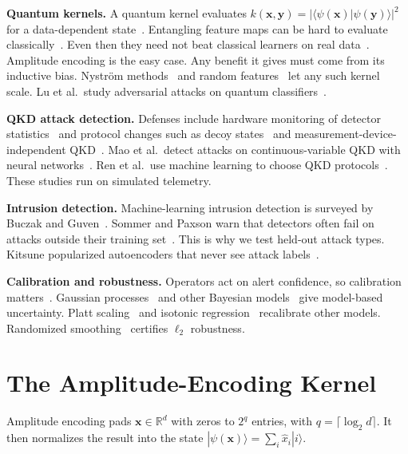\documentclass[journal]{IEEEtran}
\begin{document}
\textbf{Quantum kernels.} A quantum kernel evaluates
$k(\mathbf{x},\mathbf{y})=|\langle\psi(\mathbf{x})|\psi(\mathbf{y})\rangle|^2$ for a
data-dependent state~\cite{havlicek2019supervised}. Entangling feature maps can be
hard to evaluate classically~\cite{liu2021rigorous}. Even then they need not beat
classical learners on real data~\cite{huang2021power}. Amplitude encoding is the
easy case. Any benefit it gives must come from its inductive bias. Nystr\"om
methods~\cite{williams2001nystrom} and random features~\cite{rahimi2007random} let
any such kernel scale. Lu et al.\ study adversarial attacks on quantum
classifiers~\cite{lu2020quantum}.

\textbf{QKD attack detection.} Defenses include hardware monitoring of detector
statistics~\cite{dasilva2012monitoring} and protocol changes such as decoy
states~\cite{lo2005decoy} and measurement-device-independent
QKD~\cite{lo2012measurement}. Mao et al.\ detect attacks on continuous-variable
QKD with neural networks~\cite{mao2020detecting}. Ren et al.\ use machine learning
to choose QKD protocols~\cite{ren2021machine}. These studies run on simulated
telemetry.

\textbf{Intrusion detection.} Machine-learning intrusion detection is surveyed by
Buczak and Guven~\cite{buczak2016survey}. Sommer and Paxson warn that detectors
often fail on attacks outside their training set~\cite{sommer2010outside}. This is
why we test held-out attack types. Kitsune popularized autoencoders that never
see attack labels~\cite{mirsky2018kitsune}.

\textbf{Calibration and robustness.} Operators act on alert confidence, so
calibration matters~\cite{guo2017calibration}. Gaussian
processes~\cite{rasmussen2006gaussian} and other Bayesian
models~\cite{perusquia2022bayesian} give model-based uncertainty. Platt
scaling~\cite{platt1999probabilistic} and isotonic
regression~\cite{zadrozny2002transforming} recalibrate other models. Randomized
smoothing~\cite{cohen2019certified} certifies $\ell_2$ robustness.

\section{The Amplitude-Encoding Kernel}
\label{sec:kernel}

Amplitude encoding pads $\mathbf{x}\in\mathbb{R}^d$ with zeros to $2^q$ entries,
with $q=\lceil\log_2 d\rceil$. It then normalizes the result into the state
$|\psi(\mathbf{x})\rangle=\sum_i \hat{x}_i|i\rangle$.
\end{document}

